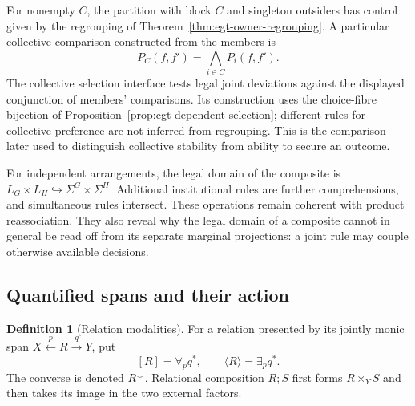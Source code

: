 \documentclass[11pt,a4paper]{article}
\numberwithin{equation}{section}
\theoremstyle{definition}
\newtheorem{definition}[theorem]{Definition}
\theoremstyle{remark}
\theoremstyle{plain}
\begin{document}
For nonempty $C$, the partition with block $C$ and singleton outsiders has
control given by the regrouping of Theorem~\ref{thm:egt-owner-regrouping}.
A particular collective
comparison constructed from the members is
\[
 P_C(f,f')=\bigwedge_{i\in C}P_i(f,f').
\]
The collective selection interface tests legal joint deviations
against the displayed conjunction of members' comparisons. Its
construction uses the choice-fibre bijection of
Proposition~\ref{prop:cgt-dependent-selection}; different rules for
collective preference are not inferred from regrouping. This is the
comparison later used to distinguish collective stability from ability
to secure an outcome.

For independent arrangements, the legal domain of the composite is
$L_G\times L_H\hookrightarrow\Sigma^G\times\Sigma^H$.
Additional institutional rules are further comprehensions, and
simultaneous rules intersect. These operations remain coherent with
product reassociation. They also reveal why the legal domain of a
composite cannot in general be read off from its separate marginal
projections: a joint rule may couple otherwise available decisions.

\subsection{Quantified spans and their action}

\begin{definition}[Relation modalities]
\label{def:egt-relation-modalities}
For a relation presented by its jointly monic span
$X\xleftarrow{p}R\xrightarrow{q}Y$, put
\begin{equation}\label{eq:egt-span-modalities}
 [R]=\forall_pq^*,\qquad\langle R\rangle=\exists_pq^*.
\end{equation}
The converse is denoted $R^\smile$. Relational composition $R;S$ first
forms $R\times_Y S$ and then takes its image in the two external factors.
\end{definition}
\end{document}
